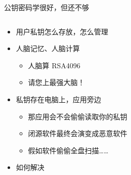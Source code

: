 \documentclass[aspectratio=169]{ctexbeamer}
\begin{document}
\begin{frame}{公钥密码学很好，但还不够}
  \begin{columns}
    \begin{column}{0.5\textwidth}
      \begin{itemize}
        \item 用户私钥怎么存放，怎么管理
        \item<2-> 人脑记忆、人脑计算\begin{itemize}
          \item 人脑算 RSA4096
          \item 请您上最强大脑！
        \end{itemize}
        \item<3-> 私钥存在电脑上，应用旁边\begin{itemize}
          \item 那应用会不会偷偷读取你的私钥
          \item 闭源软件最终会演变成恶意软件
          \item 假如软件偷偷全盘扫描……
        \end{itemize}
        \item<4-> 如何解决
      \end{itemize}
    \end{column}
    \begin{column}{0.5\textwidth}
      \begin{center}
      \end{center}
    \end{column}
  \end{columns}
\end{frame}
\end{document}
